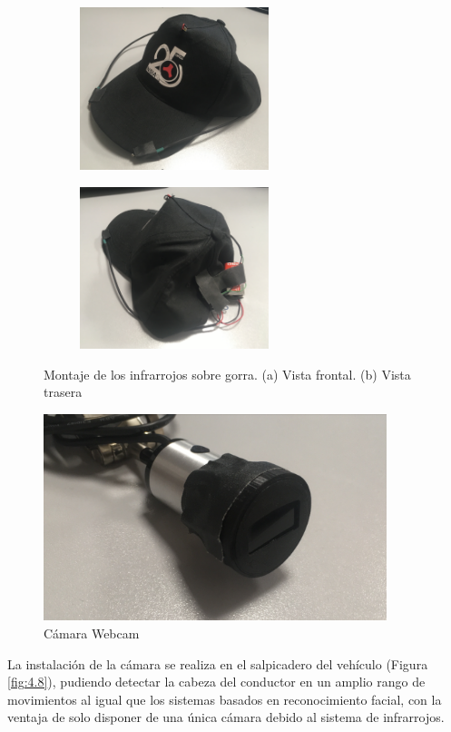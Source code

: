 \begin{figure}[h]
  \centering
  \begin{subfigure}[b]{0.40\textwidth}
    \includegraphics[width=5.5cm]{figures/4.6a.png}
    \caption{}
    \label{fig:4.6a}
  \end{subfigure}
  \hfill
  \begin{subfigure}[b]{0.4\textwidth}
    \includegraphics[width=5.5cm]{figures/4.6b.png}
    \caption{}
    \label{fig:4.6b}
  \end{subfigure}
  \caption{Montaje de los infrarrojos sobre gorra. (a) Vista frontal. (b) Vista trasera}
  \label{fig:4.6}
\end{figure}

\begin{figure}[h]
    \centering
    \includegraphics[width=10cm]
    {figures/4.7.png}
    \caption{ \label{fig:4.7} Cámara Webcam}
\end{figure}

La instalación de la cámara se realiza en el salpicadero del vehículo (Figura \ref{fig:4.8}), pudiendo detectar la cabeza del conductor en un amplio rango de movimientos al igual que los sistemas basados en reconocimiento facial, con la ventaja de solo disponer de una única cámara debido al sistema de infrarrojos. 

